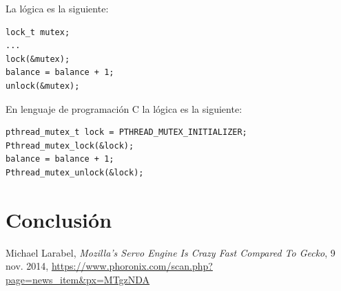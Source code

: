 \documentclass[a4paper]{article}
\begin{document}
La lógica es la siguiente:
\begin{lstlisting}
lock_t mutex;
...
lock(&mutex);
balance = balance + 1;
unlock(&mutex);
\end{lstlisting}

En lenguaje de programación C la lógica es la siguiente:
\begin{lstlisting}
pthread_mutex_t lock = PTHREAD_MUTEX_INITIALIZER;
Pthread_mutex_lock(&lock);
balance = balance + 1;
Pthread_mutex_unlock(&lock);
\end{lstlisting}

\newpage
\section{Conclusión}


\begin{thebibliography}{9}

  Michael Larabel,
  \textit{Mozilla's Servo Engine Is Crazy Fast Compared To Gecko},
  9 nov. 2014,\newline
  \url{https://www.phoronix.com/scan.php?page=news_item&px=MTgzNDA}

\end{thebibliography}
\end{document}
